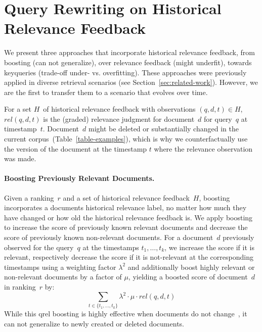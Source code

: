 \section{Query Rewriting on Historical Relevance Feedback}

We present three approaches that incorporate historical relevance feedback, from \Ni boosting (can not generalize), over \Nii relevance feedback (might underfit), towards \Niii keyqueries (trade-off under- vs. overfitting). These approaches were previously applied in diverse retrieval scenarios (see Section~\ref{sec:related-work}). However, we are the first to transfer them to a scenario that evolves over time.

For a set $H$~of historical relevance feedback with observations $(q, d, t) \in H$, $rel(q, d, t)$ is the (graded) relevance judgment for document~$d$ for query~$q$ at timestamp~$t$. Document~$d$ might be deleted or substantially changed in the current corpus~(Table~\ref{table-examples}), which is why we counterfactually use the version of the document at the timestamp $t$ where the relevance observation was made.

\paragraph{Boosting Previously Relevant Documents.} Given a ranking~$r$ and a set of historical relevance feedback~$H$, boosting incorporates a documents historical relevance label, no matter how much they have changed or how old the historical relevance feedback is. We apply boosting to increase the score of previously known relevant documents and decrease the score of previously known non-relevant documents. For a document~$d$ previously observed for the query~$q$ at the timestamps $t_{1}, \ldots, t_{k}$, we increase the score if it is relevant, respectively decrease the score if it is not-relevant at the corresponding timestamps using a weighting factor $\lambda^2$ and additionally boost highly relevant or non-relevant documents by a factor of $\mu$, yielding a boosted score of document~$d$ in ranking~$r$ by:
\begin{equation}
\sum\limits_{t \in \{t_{1}, \ldots, t_{k}\}} \lambda^2 \cdot \mu \cdot rel(q,d,t)
\end{equation}
While this qrel boosting is highly effective when documents do not change~\cite{alkhalifa:2024,keller:2024b}, it can not generalize to newly created or deleted documents.

